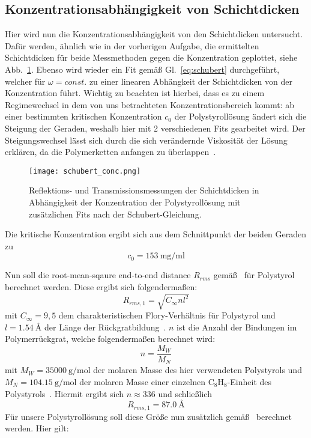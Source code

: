 \subsection{Konzentrationsabhängigkeit von Schichtdicken}

Hier wird nun die Konzentrationsabhängigkeit von den Schichtdicken untersucht. Dafür werden, ähnlich wie in der vorherigen Aufgabe, die ermittelten Schichtdicken für beide Messmethoden gegen die Konzentration geplottet, siehe Abb.~\ref{fig:concentration}. Ebenso wird wieder ein Fit gemäß Gl.~\eqref{eq:schubert} durchgeführt, welcher für $\omega = const.$ zu einer linearen Abhängkeit der Schichtdicken von der Konzentration führt. Wichtig zu beachten ist hierbei, dass es zu einem Regimewechsel in dem von uns betrachteten Konzentrationsbereich kommt: ab einer bestimmten kritischen Konzentration $c_0$ der Polystyrollösung ändert sich die Steigung der Geraden, weshalb hier mit 2 verschiedenen Fits gearbeitet wird. Der Steigungswechsel lässt sich durch die sich verändernde Viskosität der Lösung erklären, da die Polymerketten anfangen zu überlappen~\cite[]{Daum}. 

\begin{figure}
    \centering
    \texttt{[image: schubert\_conc.png]}
    \caption{Reflektions- und Transmissionsmessungen der Schichtdicken in Abhängigkeit der Konzentration der Polystyrollösung mit zusätzlichen Fits nach der Schubert-Gleichung.}
    \label{fig:concentration}
\end{figure}

Die kritische Konzentration ergibt sich aus dem Schnittpunkt der beiden Geraden zu 
\begin{equation*}
    c_0 = \SI{153}{\milli\gram\per\milli\litre}
\end{equation*}

Nun soll die root-mean-sqaure end-to-end distance $R_{rms}$ gemäß~\cite[]{properties} für Polystyrol berechnet werden. Diese ergibt sich folgendermaßen:
\begin{equation}\label{eq:rms}
    R_{rms, 1} = \sqrt{C_\infty n l^2}
\end{equation}
mit $C_\infty = 9,5$ dem charakteristischen Flory-Verhältnis für Polystyrol und $l = \SI{1,54}{\angstrom}$ der Länge der Rückgratbildung~\cite[]{Anleitung}. $n$ ist die Anzahl der Bindungen im Polymerrückgrat, welche folgendermaßen berechnet wird:
\begin{equation}
    n = \frac{M_W}{M_N}
\end{equation}
mit $M_W = \SI{35000}{\gram\per\mol}$ der molaren Masse des hier verwendeten Polystyrols und $M_N = \SI{104,15}{\gram\per\mol}$ der molaren Masse einer einzelnen $\mathrm{C}_8\mathrm{H}_8$-Einheit des Polystyrols~\cite[]{properties}. Hiermit ergibt sich $n \approx \num{336}$ und schließlich
\begin{equation*}
    R_{rms, 1} = \SI{87,0}{\angstrom}
\end{equation*}
Für unsere Polystyrollösung soll diese Größe nun zusätzlich gemäß~\cite[]{Daum} berechnet werden. Hier gilt:

